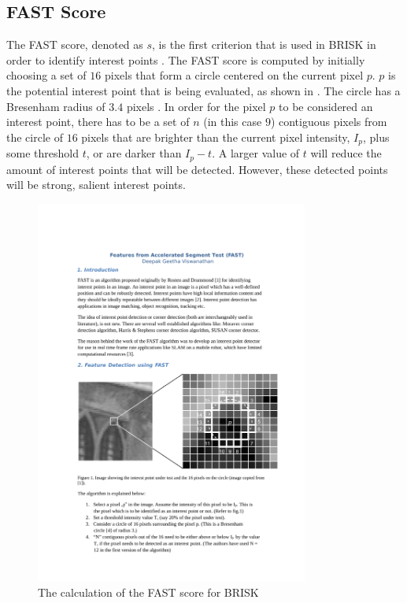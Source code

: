 \documentclass{report}
\begin{document}
\subsection{FAST Score}
\label{sec:fastScore}

The FAST score, denoted as $s$, is the first criterion that is used in BRISK in order to identify interest points \cite{Rosten2006}. The FAST score is computed by initially choosing a set of $16$ pixels that form a circle centered on the current pixel $p$. $p$ is the potential interest point that is being evaluated, as shown in  \cite{Rosten2006}. The circle has a Bresenham radius of $3.4$ pixels \cite{Mair2010}. In order for the pixel $p$ to be considered an interest point, there has to be a set of $n$ (in this case $9$) contiguous pixels from the circle of $16$ pixels that are brighter than the current pixel intensity, $I_p$, plus some threshold $t$, or are darker than $I_p - t$. A larger value of $t$ will reduce the amount of interest points that will be detected. However, these detected points will be strong, salient interest points. \\

\begin{figure}[h!] 
  \centering
    \includegraphics[width=0.8\textwidth]{../Drawings/methods/FASTScoreCalculation.pdf}
    \caption{The calculation of the FAST score for BRISK}
    \label{fig:fastScore}
\end{figure}
\end{document}
